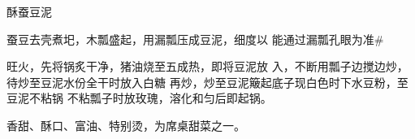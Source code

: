 \begin{recipe}{酥蚕豆泥}

\ingredients


\cooking

\step 	蚕豆去壳煮圯，木瓢盛起，用漏瓢压成豆泥，细度以 能通过漏瓢孔眼为准#

\step 	旺火，先将锅炙干净，猪油烧至五成热，即将豆泥放 入，不断用瓢子边搅边炒，待炒至豆泥水份全干时放入白糖 再炒，炒至豆泥簸起底子现白色时下水豆粉，至豆泥不粘锅 不粘瓢子时放玫瑰，溶化和匀后即起锅。

\notes

香甜、酥口、富油、特别烫，为席桌甜菜之一。

\end{recipe}

